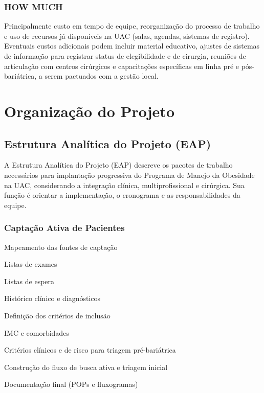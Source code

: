 \documentclass[12pt]{article}
\begin{document}
\subsubsection{HOW MUCH}
\label{sec:org4380281}
Principalmente custo em tempo de equipe, reorganização do processo de trabalho e uso de recursos já disponíveis na UAC (salas, agendas, sistemas de registro). Eventuais custos adicionais podem incluir material educativo, ajustes de sistemas de informação para registrar status de elegibilidade e de cirurgia, reuniões de articulação com centros cirúrgicos e capacitações específicas em linha pré e pós-bariátrica, a serem pactuados com a gestão local.

\begin{center}

\label{org585be89}
\end{center}

\FGVNewPage
\section{Organização do Projeto}
\label{sec:orge510657}
\subsection{Estrutura Analítica do Projeto (EAP)}
\label{sec:org6eccb7d}
A Estrutura Analítica do Projeto (EAP) descreve os pacotes de trabalho necessários para implantação progressiva do Programa de Manejo da Obesidade na UAC, considerando a integração clínica, multiprofissional e cirúrgica. Sua função é orientar a implementação, o cronograma e as responsabilidades da equipe.

\subsubsection{Captação Ativa de Pacientes}
\label{sec:org5fda033}
\begin{hlevelthree}
\item Mapeamento das fontes de captação
\begin{hbullet}
\item Listas de exames
\item Listas de espera
\item Histórico clínico e diagnósticos
\end{hbullet}
\item Definição dos critérios de inclusão
\begin{hbullet}
\item IMC e comorbidades
\item Critérios clínicos e de risco para triagem pré-bariátrica
\end{hbullet}
\item Construção do fluxo de busca ativa e triagem inicial
\item Documentação final (POPs e fluxogramas)
\end{hlevelthree}
\end{document}
